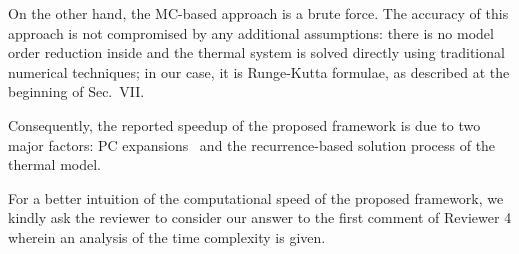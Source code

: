 \begin{authors}
On the other hand, the MC-based approach is a brute force.
The accuracy of this approach is not compromised by any additional assumptions: there is no model order reduction inside and the thermal system is solved directly using traditional numerical techniques; in our case, it is Runge-Kutta formulae, as described at the beginning of Sec.~VII.

Consequently, the reported speedup of the proposed framework is due to two major factors: PC expansions \perse\ and the recurrence-based solution process of the thermal model.

For a better intuition of the computational speed of the proposed framework, we kindly ask the reviewer to consider our answer to the first comment of Reviewer 4 wherein an analysis of the time complexity is given.

\end{authors}
